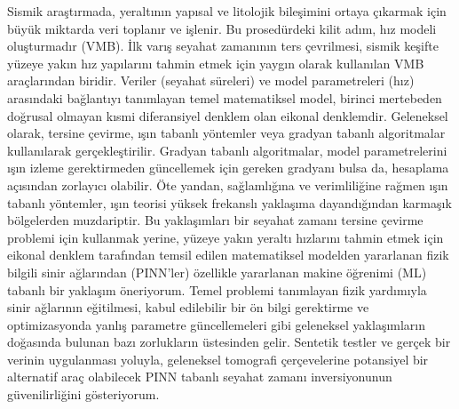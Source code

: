 Sismik araştırmada, yeraltının yapısal ve litolojik bileşimini ortaya çıkarmak için büyük miktarda veri toplanır ve işlenir. Bu prosedürdeki kilit adım, hız modeli oluşturmadır (VMB). İlk varış seyahat zamanının ters çevrilmesi, sismik keşifte yüzeye yakın hız yapılarını tahmin etmek için yaygın olarak kullanılan VMB araçlarından biridir. Veriler (seyahat süreleri) ve model parametreleri (hız) arasındaki bağlantıyı tanımlayan temel matematiksel model, birinci mertebeden doğrusal olmayan kısmi diferansiyel denklem olan eikonal denklemdir. Geleneksel olarak, tersine çevirme, ışın tabanlı yöntemler veya gradyan tabanlı algoritmalar kullanılarak gerçekleştirilir. Gradyan tabanlı algoritmalar, model parametrelerini ışın izleme gerektirmeden güncellemek için gereken gradyanı bulsa da, hesaplama açısından zorlayıcı olabilir. Öte yandan, sağlamlığına ve verimliliğine rağmen ışın tabanlı yöntemler, ışın teorisi yüksek frekanslı yaklaşıma dayandığından karmaşık bölgelerden muzdariptir. Bu yaklaşımları bir seyahat zamanı tersine çevirme problemi için kullanmak yerine, yüzeye yakın yeraltı hızlarını tahmin etmek için eikonal denklem tarafından temsil edilen matematiksel modelden yararlanan fizik bilgili sinir ağlarından (PINN'ler) özellikle yararlanan makine öğrenimi (ML) tabanlı bir yaklaşım öneriyorum. Temel problemi tanımlayan fizik yardımıyla sinir ağlarının eğitilmesi, kabul edilebilir bir ön bilgi gerektirme ve optimizasyonda yanlış parametre güncellemeleri gibi geleneksel yaklaşımların doğasında bulunan bazı zorlukların üstesinden gelir. Sentetik testler ve gerçek bir verinin uygulanması yoluyla, geleneksel tomografi çerçevelerine potansiyel bir alternatif araç olabilecek PINN tabanlı seyahat zamanı inversiyonunun güvenilirliğini gösteriyorum.
	
